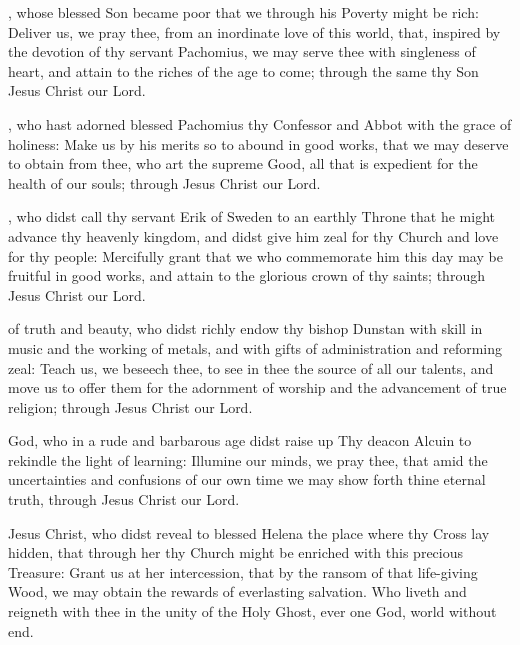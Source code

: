 , whose blessed Son became poor that we through his Poverty might be rich: Deliver us, we pray thee, from an inordinate love of this world, that, inspired by the devotion of thy servant Pachomius, we may serve thee with singleness of heart, and attain to the riches of the age to come; through the same thy Son Jesus Christ our Lord.

, who hast adorned blessed Pachomius thy Confessor and Abbot with the grace of holiness: Make us by his merits so to abound in good works, that we may deserve to obtain from thee, who art the supreme Good, all that is expedient for the health of our souls; through Jesus Christ our Lord.

, who didst call thy servant Erik of Sweden to an earthly Throne that he might advance thy heavenly kingdom, and didst give him zeal for thy Church and love for thy people: Mercifully grant that we who commemorate him this day may be fruitful in good works, and attain to the glorious crown of thy saints; through Jesus Christ our Lord.

 of truth and beauty, who didst richly endow thy bishop Dunstan with skill in music and the working of metals, and with gifts of administration and reforming zeal: Teach us, we beseech thee, to see in thee the source of all our talents, and move us to offer them for the adornment of worship and the advancement of true religion; through Jesus Christ our Lord.

 God, who in a rude and barbarous age didst raise up Thy deacon Alcuin to rekindle the light of learning: Illumine our minds, we pray thee, that amid the uncertainties and confusions of our own time we may show forth thine eternal truth, through Jesus Christ our Lord.

 Jesus Christ, who didst reveal to blessed Helena the place where thy Cross lay hidden, that through her thy Church might be enriched with this precious Treasure: Grant us at her intercession, that by the ransom of that life-giving Wood, we may obtain the rewards of everlasting salvation. Who liveth and reigneth with thee in the unity of the Holy Ghost, ever one God, world without end.

